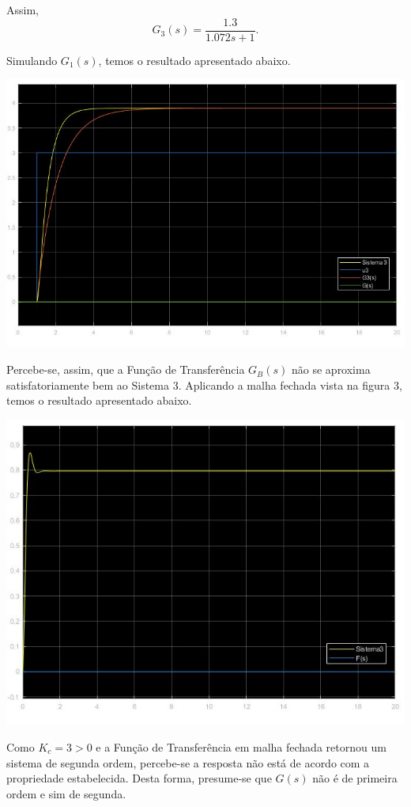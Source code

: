 \documentclass[
]{book}
\theoremstyle{definition}
\theoremstyle{definition}
\theoremstyle{definition}
\theoremstyle{remark}
\begin{document}
Assim,
\[
G_3(s) = \frac {1.3}{1.072s+1}.
\]

Simulando \(G_1(s)\), temos o resultado apresentado abaixo.

\includegraphics{Imagens/Lab3/Resolução/prob3AB.jpg}

Percebe-se, assim, que a Função de Transferência \(G_B(s)\) não se aproxima satisfatoriamente bem ao Sistema 3. Aplicando a malha fechada vista na figura 3, temos o resultado apresentado abaixo.

\includegraphics{Imagens/Lab3/Resolução/prob3AC.jpg}

Como \(K_c = 3 > 0\) e a Função de Transferência em malha fechada retornou um sistema de segunda ordem, percebe-se a resposta não está de acordo com a propriedade estabelecida. Desta forma, presume-se que \(G(s)\) não é de primeira ordem e sim de segunda.
\end{document}
